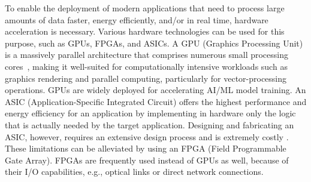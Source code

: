 To enable the deployment of modern applications that need to process large amounts of data faster, energy efficiently, and/or in real time, hardware acceleration is necessary. Various hardware technologies can be used for this purpose, such as GPUs, FPGAs, and ASICs. %
A GPU (Graphics Processing Unit) is a massively parallel architecture that comprises numerous small processing cores~\cite{gpuComputing}, making it well-suited for computationally intensive workloads such as graphics rendering and parallel computing, particularly for vector-processing operations. GPUs are widely deployed for accelerating AI/ML model training. %
%
An ASIC (Application-Specific Integrated Circuit) %
offers the highest performance and energy efficiency for an application by implementing in hardware only the logic that is actually needed by the target application. Designing and fabricating an ASIC, however, requires an extensive design process and is extremely costly \cite{asic-challenges}. These limitations can be alleviated by using an FPGA (Field Programmable Gate Array). FPGAs are frequently used instead of GPUs as well, because of their I/O capabilities, e.g., optical links or direct network connections.

